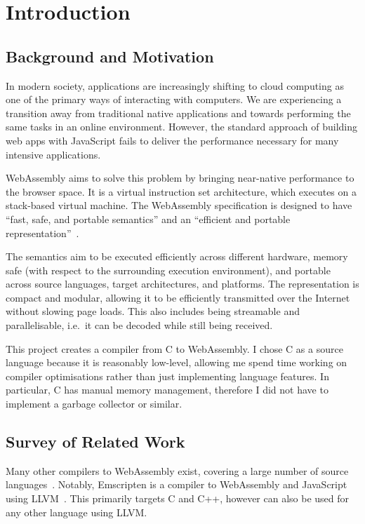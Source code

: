 \documentclass[00-main.tex]{subfiles}
\begin{document}
\chapter{Introduction}

\section{Background and Motivation}

In modern society, applications are increasingly shifting to cloud computing as one of the primary ways of interacting with computers.
We are experiencing a transition away from traditional native applications and towards performing the same tasks in an online environment.
However, the standard approach of building web apps with JavaScript fails to deliver the performance necessary for many intensive applications.

WebAssembly aims to solve this problem by bringing near-native performance to the browser space.
It is a virtual instruction set architecture, which executes on a stack-based virtual machine.
The WebAssembly specification is designed to have ``fast, safe, and portable semantics'' and an ``efficient and portable representation''~.

The semantics aim to be executed efficiently across different hardware, memory safe (with respect to the surrounding execution environment), and portable across source languages, target architectures, and platforms.
The representation is compact and modular, allowing it to be efficiently transmitted over the Internet without slowing page loads.
This also includes being streamable and parallelisable, i.e.~it can be decoded while still being received.

This project creates a compiler from C to WebAssembly.
I chose C as a source language because it is reasonably low-level, allowing me spend time working on compiler optimisations rather than just implementing language features.
In particular, C has manual memory management, therefore I did not have to implement a garbage collector or similar.


\section{Survey of Related Work}

Many other compilers to WebAssembly exist, covering a large number of source languages~.
Notably, Emscripten is a compiler to WebAssembly and JavaScript using LLVM~.
This primarily targets C and C++, however can also be used for any other language using LLVM\@.
\end{document}
